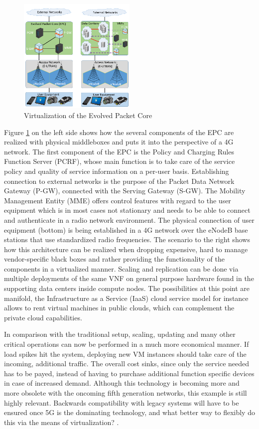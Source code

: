 \begin{figure}[h]
	\centering
	\includegraphics[width=0.5\textwidth]{images/epc_virt.png}
	\caption{Virtualization of the Evolved Packet Core \cite{mijumbi2016network}}
	\label{img:epc_virt}
\end{figure}

Figure \ref{img:epc_virt} on the left side shows how the several components of the EPC are realized with physical middleboxes and puts it into the perspective of a 4G network. The first component of the EPC is the Policy and Charging Rules Function Server (PCRF), whose main function is to take care of the service policy and quality of service information on a per-user basis. Establishing connection to external networks is the purpose of the Packet Data Network Gateway (P-GW), connected with the Serving Gateway (S-GW). The Mobility Management Entity (MME) offers control features with regard to the user equipment which is in most cases not stationary and needs to be able to connect and authenticate in a radio network environment. The physical connection of user equipment (bottom) is being established in a 4G network over the eNodeB base stations that use standardized radio frequencies.
The scenario to the right shows how this architecture can be realized when dropping expensive, hard to manage vendor-specific black boxes and rather providing the functionality of the components in a virtualized manner. Scaling and replication can be done via multiple deployments of the same VNF on general purpose hardware found in the supporting data centers inside compute nodes. The possibilities at this point are manifold, the Infrastructure as a Service (IaaS) cloud service model for instance allows to rent virtual machines in public clouds, which can complement the private cloud capabilities. 

In comparison with the traditional setup, scaling, updating and many other critical operations can now be performed in a much more economical manner. If load spikes hit the system, deploying new VM instances should take care of the incoming, additional traffic. The overall cost sinks, since only the service needed has to be payed, instead of having to purchase additional function specific devices in case of increased demand. Although this technology is becoming more and more obsolete with the oncoming fifth generation networks, this example is still highly relevant. Backwards compatibility with legacy systems will have to be ensured once 5G is the dominating technology, and what better way to flexibly do this via the means of virtualization? \cite{4g} \cite{mijumbi2016network}. 

